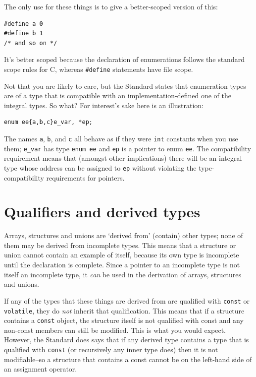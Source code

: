   The only use for these things is to give a better-scoped version of
   this:


  \begin{Verbatim}
#define a 0
#define b 1
/* and so on */
\end{Verbatim}

  It's better scoped because the declaration of enumerations follows the
   standard scope rules for C, whereas \texttt{\#define} statements have
   file scope.


  Not that you are likely to care, but the Standard states that enumeration
   types are of a type that is compatible with an implementation-defined one of
   the integral types. So what? For interest's sake here is an
   illustration:


  \begin{Verbatim}
enum ee{a,b,c}e_var, *ep;
\end{Verbatim}

  The names \texttt{a}, \texttt{b}, and \texttt{c} all behave as
   if they were \texttt{int} constants when you use them;
   \texttt{e\_var} has type \texttt{enum ee} and \texttt{ep} is
   a pointer to enum \texttt{ee}. The compatibility requirement means that
   (amongst other implications) there will be an integral type whose address
   can be assigned to \texttt{ep} without violating the type-compatibility
   requirements for pointers.


 
        \section{Qualifiers and derived types}
        

  

  Arrays, structures and unions are `derived from' (contain) other
   types; none of them may be derived from incomplete types. This means that
   a structure or union cannot contain an example of itself, because its own
   type is incomplete until the declaration is complete. Since a pointer to an
   incomplete type is not itself an incomplete type, it \textit{can} be used in
   the derivation of arrays, structures and unions.


  If any of the types that these things are derived from are qualified with
   \texttt{const} or \texttt{volatile}, they do \textit{not} inherit
   that qualification. This means that if a structure contains
   a \texttt{const} object, the structure itself is not qualified with
   const and any non-const members can still be modified. This is what you
   would expect. However, the Standard does says that if any derived type
   contains a type that is qualified with \texttt{const} (or recursively
   any inner type does) then it is not modifiable--so a structure that
   contains a const cannot be on the left-hand side of an assignment
   operator.


